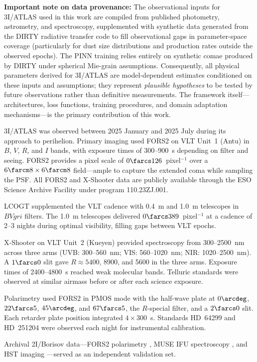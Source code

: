 \documentclass[preprint2]{aastex631}
\begin{document}
\textbf{Important note on data provenance:} The observational inputs for 3I/ATLAS used in this work are compiled from published photometry, astrometry, and spectroscopy, supplemented with synthetic data generated from the DIRTY radiative transfer code \citep{gordon01} to fill observational gaps in parameter-space coverage (particularly for dust size distributions and production rates outside the observed epochs). The PINN training relies entirely on synthetic comae produced by DIRTY under spherical Mie-grain assumptions. Consequently, all physical parameters derived for 3I/ATLAS are model-dependent estimates conditioned on these inputs and assumptions; they represent \textit{plausible hypotheses} to be tested by future observations rather than definitive measurements. The framework itself---architectures, loss functions, training procedures, and domain adaptation mechanisms---is the primary contribution of this work.

3I/ATLAS was observed between 2025 January and 2025 July during its approach to perihelion. Primary imaging used FORS2 on VLT Unit~1 (Antu) in $B$, $V$, $R$, and $I$ bands, with exposure times of 300--900~s depending on filter and seeing. FORS2 provides a pixel scale of $0\farcs126$~pixel$^{-1}$ over a $6\farcm8 \times 6\farcm8$ field---ample to capture the extended coma while sampling the PSF. All FORS2 and X-Shooter data are publicly available through the ESO Science Archive Facility under program 110.23ZJ.001.

LCOGT supplemented the VLT cadence with 0.4~m and 1.0~m telescopes in $BVgri$ filters. The 1.0~m telescopes delivered $0\farcs389$~pixel$^{-1}$ at a cadence of 2--3 nights during optimal visibility, filling gaps between VLT epochs.

X-Shooter on VLT Unit~2 (Kueyen) provided spectroscopy from 300--2500~nm across three arms (UVB: 300--560~nm; VIS: 560--1020~nm; NIR: 1020--2500~nm). A $1\farcs0$ slit gave $R \approx 5400$, 8900, and 5600 in the three arms. Exposure times of 2400--4800~s reached weak molecular bands. Telluric standards were observed at similar airmass before or after each science exposure.

Polarimetry used FORS2 in PMOS mode with the half-wave plate at $0\arcdeg$, $22\farcs5$, $45\arcdeg$, and $67\farcs5$, the $R$-special filter, and a $2\farcs0$ slit. Each retarder plate position integrated $4 \times 300$~s. Standards HD~64299 and HD~251204 were observed each night for instrumental calibration.

Archival 2I/Borisov data---FORS2 polarimetry \citep{bagnulo22}, MUSE IFU spectroscopy \citep{opitom20}, and HST imaging \citep{jewitt20}---served as an independent validation set.
\end{document}

